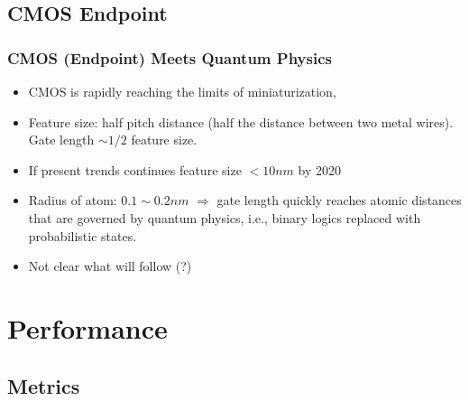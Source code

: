 \documentclass{beamer}
\begin{document}
\subsection{CMOS Endpoint}
\begin{frame}[fragile,t]
\frametitle{CMOS (Endpoint) Meets Quantum Physics}

\begin{itemize}
    \item CMOS is rapidly reaching the limits of miniaturization,\medskip

    \item Feature size: half pitch distance (half the distance between
            two metal wires). Gate length $\sim 1/2$ feature size.\medskip

    \item If present trends continues feature size $< 10 nm$ by 2020\medskip

    \item Radius of atom: $0.1 \sim 0.2 nm$ $\Rightarrow$ gate length quickly
            reaches atomic distances that are governed by quantum physics,
            i.e., binary logics replaced with probabilistic states.\medskip

    \item Not clear what will follow (?)
\end  {itemize}
\end{frame}

\section{Performance}

\begin{frame}[fragile]
	\tableofcontents[currentsection]
\end{frame}

\subsection{Metrics}
\end{document}

